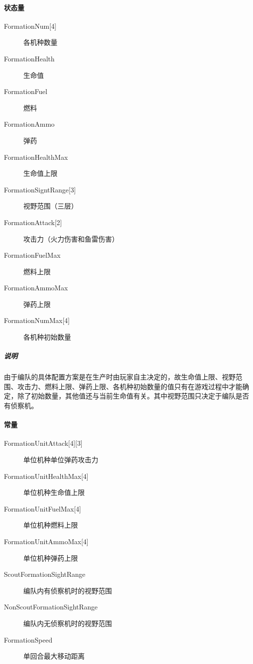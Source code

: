 \documentclass[11pt,a4paper]{article}
\begin{document}
      \paragraph{状态量}
        \begin{minipage}[t]{0.6\textwidth}
          \begin{description}
            \item[{FormationNum[4]}] 各机种数量
            \item[FormationHealth] 生命值
            \item[FormationFuel] 燃料
            \item[FormationAmmo] 弹药
            \item[FormationHealthMax] 生命值上限
            \item[{FormationSigntRange[3]}] 视野范围（三层）
            \item[{FormationAttack[2]}] 攻击力（火力伤害和鱼雷伤害）
            \item[FormationFuelMax] 燃料上限
            \item[FormationAmmoMax] 弹药上限
            \item[{FormationNumMax[4]}] 各机种初始数量
          \end{description}
        \end{minipage}
        \subparagraph{说明}
          由于编队的具体配置方案是在生产时由玩家自主决定的，故生命值上限、视野范围、攻击力、燃料上限、弹药上限、各机种初始数量的值只有在游戏过程中才能确定，除了初始数量，其他值还与当前生命值有关。其中视野范围只决定于编队是否有侦察机。

      \paragraph{常量}
        \begin{minipage}[t]{0.6\textwidth}
          \begin{description}
            \item[{FormationUnitAttack[4][3]}] 单位机种单位弹药攻击力
            \item[{FormationUnitHealthMax[4]}] 单位机种生命值上限
            \item[{FormationUnitFuelMax[4]}] 单位机种燃料上限
            \item[{FormationUnitAmmoMax[4]}] 单位机种弹药上限
            \item[ScoutFormationSightRange] 编队内有侦察机时的视野范围
            \item[NonScoutFormationSightRange] 编队内无侦察机时的视野范围
            \item[FormationSpeed] 单回合最大移动距离
          \end{description}
        \end{minipage}
\end{document}
